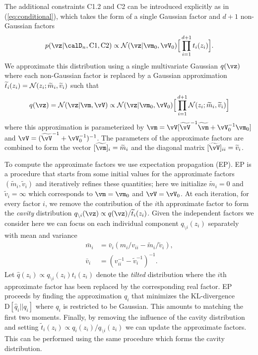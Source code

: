 The additional constraints C1.2 and C2 can be introduced explicitly as in
(\ref{eq:conditional}), which takes the form of a single Gaussian factor and
$d+1$ non-Gaussian factors
\begin{equation*}
    p(\vz|\D_n,\C1,\C2)
    \propto
    \Normal(\vz|\vm_0,\vV_0)
    \Big[ \prod_{i=1}^{d+1} t_i(z_i) \Big].
\end{equation*}
We approximate this distribution using a single multivariate Gaussian $q(\vz)$
where each non-Gaussian factor is replaced by a Gaussian approximation
$\widetilde t_i(z_i)=\mathcal{N}(z_i;\widetilde m_i, \widetilde v_i)$ such that
\begin{equation*}
    q(\vz)
    = \Normal(\vz|\vm,\vV)
    \propto \Normal(\vz|\vm_0,\vV_0)
    \Big[ \prod_{i=1}^{d+1} \Normal(z_i;\widetilde m_i, \widetilde v_i) \Big]
\end{equation*}
where this approximation is parameterized by
$\vm=\vV[\widetilde\vV^{-1}\widetilde\vm+\vV_0^{-1}\vm_0]$ and
$\vV=(\widetilde\vV^{-1}+\vV_0^{-1})^{-1}$. The parameters of the approximate
factors are combined to form the vector $[\widetilde\vm]_i=\widetilde m_i$ and
the diagonal matrix $[\widetilde\vV]_{ii}=\widetilde v_i$. 

\def\oldm{\bar m_{i}}
\def\oldv{\bar v_{i}}
\def\norm{\bar Z_{i}}

To compute the approximate factors we use expectation propagation (EP). EP is a
procedure that starts from some initial values for the approximate factors
$(\widetilde m_i, \widetilde v_i)$ and iteratively refines these quantities;
here we initialize $\widetilde m_i=0$ and $\widetilde v_i=\infty$ which
corresponds to $\vm=\vm_0$ and $\vV=\vV_0$.  At each iteration, for every factor
$i$, we remove the contribution of the $i$th approximate factor to form the
\emph{cavity} distribution $q_{\setminus i}(\vz)\propto q(\vz)/\widetilde
t_i(z_i)$. Given the independent factors we consider here we can focus on each
individual component $q_{\setminus i}(z_i)$ separately with mean and variance
\begin{align*}
    \oldm &= \oldv(m_i/v_{ii} - \widetilde m_i/\widetilde v_i), \\
    \oldv &= (v_{ii}^{-1} - \widetilde v_i^{-1})^{-1}.
\end{align*}
Let $\hat q(z_i)\propto q_{\setminus i}(z_i) t_i(z_i)$ denote the \emph{tilted}
distribution where the $i$th approximate factor has been replaced by the
corresponding real factor. EP proceeds by finding the approximation $q_i$ that
minimizes the KL-divergence $\mathrm{D}[\hat q_i||q_i]$ where $q_i$ is
restricted to be Gaussian. This amounts to matching the first two moments.
Finally, by removing the influence of the cavity distribution and setting
$\widetilde t_i(z_i)\propto q_i(z_i)/q_{\setminus i}(z_i)$ we can update the
approximate factors. This can be performed using the same procedure which forms
the cavity distribution.


